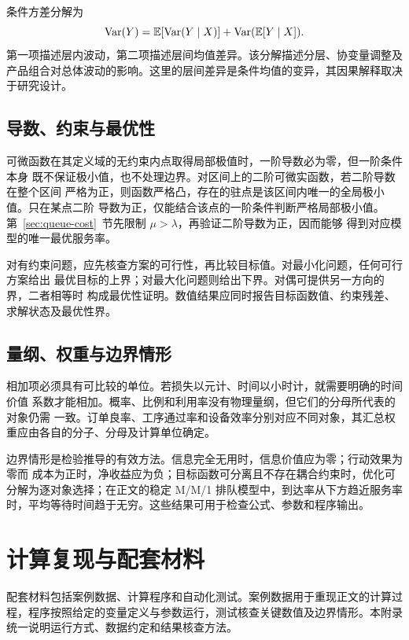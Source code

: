 条件方差分解为
\[
\operatorname{Var}(Y)=\mathbb E[\operatorname{Var}(Y\mid X)]
+\operatorname{Var}(\mathbb E[Y\mid X]).
\]
第一项描述层内波动，第二项描述层间均值差异。该分解描述分层、协变量调整及产品组合对总体波动的影响。这里的层间差异是条件均值的变异，其因果解释取决于研究设计。

\section{导数、约束与最优性}
可微函数在其定义域的无约束内点取得局部极值时，一阶导数必为零，但一阶条件本身
既不保证极小值，也不处理边界。对区间上的二阶可微实函数，若二阶导数在整个区间
严格为正，则函数严格凸，存在的驻点是该区间内唯一的全局极小值。只在某点二阶
导数为正，仅能结合该点的一阶条件判断严格局部极小值。
第~\ref{sec:queue-cost}~节先限制 \(\mu>\lambda\)，再验证二阶导数为正，因而能够
得到对应模型的唯一最优服务率。

对有约束问题，应先核查方案的可行性，再比较目标值。对最小化问题，任何可行方案给出
最优目标的上界；对最大化问题则给出下界。对偶可提供另一方向的界，二者相等时
构成最优性证明。数值结果应同时报告目标函数值、约束残差、求解状态及最优性界。

\section{量纲、权重与边界情形}
相加项必须具有可比较的单位。若损失以元计、时间以小时计，就需要明确的时间价值
系数才能相加。概率、比例和利用率没有物理量纲，但它们的分母所代表的对象仍需
一致。订单良率、工序通过率和设备效率分别对应不同对象，其汇总权重应由各自的分子、分母及计算单位确定。

边界情形是检验推导的有效方法。信息完全无用时，信息价值应为零；行动效果为零而
成本为正时，净收益应为负；目标函数可分离且不存在耦合约束时，优化可分解为逐对象选择；在正文的稳定 M/M/1 排队模型中，到达率从下方趋近服务率时，平均等待时间趋于无穷。这些结果可用于检查公式、参数和程序输出。

\chapter{计算复现与配套材料}
\label{app:reproduction}

配套材料包括案例数据、计算程序和自动化测试。案例数据用于重现正文的计算过程，程序按照给定的变量定义与参数运行，测试核查关键数值及边界情形。本附录统一说明运行方式、数据约定和结果核查方法。

